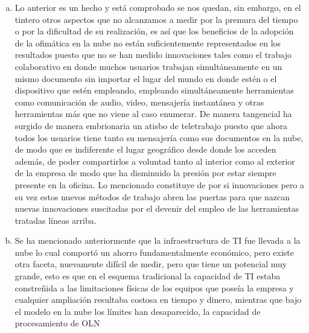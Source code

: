 \begin{enumerate}[a.]
          que en el que en el periodo pre-test se empleaba una hora hombre por
          cada 479 transacciones realizadas, mientras que en post test este valor
          ascendi\'o a 1,101 transacciones por hora hombre empleada en dar
          mantenimiento a TI, lo cual verifica que el incremento del post test
          fue de 130\% con respecto al pre test.
    \item Lo anterior es un hecho y est\'a comprobado se nos quedan, sin embargo,
          en el tintero otros aspectos que no alcanzamos a medir por la premura
          del tiempo o por la dificultad de su realizaci\'on, es as\'i que los
          beneficios de la adopci\'on de la ofim\'atica en la nube no est\'an
          suficientemente representados en los resultados puesto que no se han
          medido innovaciones tales como el trabajo colaborativo en donde muchos
          usuarios trabajan simult\'aneamente en un mismo documento sin importar
          el lugar del mundo en donde est\'en o el dispositivo que est\'en empleando,
          empleando simult\'aneamente herramientas como comunicaci\'on de audio,
          video, mensajer\'ia instant\'anea y otras herramientas m\'as que no
          viene al caso enumerar. De manera tangencial ha surgido de manera embrionaria
          un atisbo de teletrabajo puesto que ahora todos los usuarios tiene tanto
          su mensajer\'ia como sus documentos en la nube, de modo que es
          indiferente el lugar geogr\'afico desde donde los acceden adem\'as,
          de poder compartirlos a voluntad tanto al interior como al exterior de
          la empresa de modo que ha disminuido la presi\'on por estar siempre
          presente en la oficina. Lo mencionado constituye de por si innovaciones
          pero a su vez estos nuevos m\'etodos de trabajo abren las puertas para
          que nazcan nuevas innovaciones suscitadas por el devenir del empleo de
          las herramientas tratadas l\'ineas arriba.
    \item Se ha mencionado anteriormente que la infraestructura de TI fue llevada
          a la nube lo cual comport\'o un ahorro fundamentalmente econ\'omico,
          pero existe otra faceta, nuevamente dif\'icil de medir, pero que tiene
          un potencial muy grande, esto es que en el esquema tradicional la
          capacidad de TI estaba constre\~nida a las limitaciones f\'isicas de los
          equipos que pose\'ia la empresa y cualquier ampliaci\'on resultaba
          costosa en tiempo y dinero, mientras que bajo el modelo en la nube
          los l\'imites han desaparecido, la capacidad de procesamiento de OLN

\end{enumerate}
